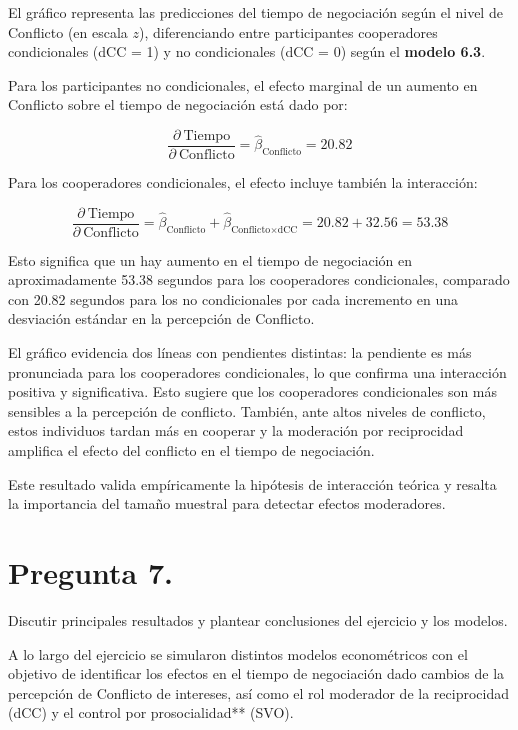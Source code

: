 \documentclass[
  spanish,
  10pt,
]{article}
\begin{document}
El gráfico representa las predicciones del tiempo de negociación según
el nivel de Conflicto (en escala \(z\)), diferenciando entre
participantes cooperadores condicionales (dCC = 1) y no condicionales
(dCC = 0) según el \textbf{modelo 6.3}.

Para los participantes no condicionales, el efecto marginal de un
aumento en Conflicto sobre el tiempo de negociación está dado por:

\[
\frac{\partial \ \text{Tiempo}}{\partial \ \text{Conflicto}} = \hat{\beta}_{\text{Conflicto}} = 20.82
\]

Para los cooperadores condicionales, el efecto incluye también la
interacción:

\[
\frac{\partial \ \text{Tiempo}}{\partial \ \text{Conflicto}} = \hat{\beta}_{\text{Conflicto}} + \hat{\beta}_{\text{Conflicto} \times \text{dCC}} = 20.82 + 32.56 = 53.38
\]

Esto significa que un hay aumento en el tiempo de negociación en
aproximadamente 53.38 segundos para los cooperadores condicionales,
comparado con 20.82 segundos para los no condicionales por cada
incremento en una desviación estándar en la percepción de Conflicto.

El gráfico evidencia dos líneas con pendientes distintas: la pendiente
es más pronunciada para los cooperadores condicionales, lo que confirma
una interacción positiva y significativa. Esto sugiere que los
cooperadores condicionales son más sensibles a la percepción de
conflicto. También, ante altos niveles de conflicto, estos individuos
tardan más en cooperar y la moderación por reciprocidad amplifica el
efecto del conflicto en el tiempo de negociación.

Este resultado valida empíricamente la hipótesis de interacción teórica
y resalta la importancia del tamaño muestral para detectar efectos
moderadores.

\section{Pregunta 7.}\label{pregunta-7.}

Discutir principales resultados y plantear conclusiones del ejercicio y
los modelos.

A lo largo del ejercicio se simularon distintos modelos econométricos
con el objetivo de identificar los efectos en el tiempo de negociación
dado cambios de la percepción de Conflicto de intereses, así como el rol
moderador de la reciprocidad (dCC) y el control por prosocialidad**
(SVO).
\end{document}
